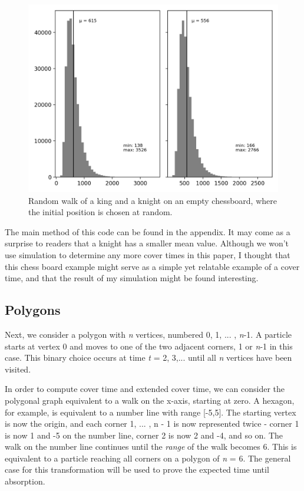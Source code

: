 \documentclass[11pt]{article}
\begin{document}
\begin{figure}[H]
\centering
\includegraphics[scale = 0.5]{chessdistrs}
\caption{Random walk of a king and a knight on an empty chessboard, where the initial position is chosen at random.}
\end{figure}

The main method of this code can be found in the appendix. It may come as a surprise to readers that a knight has a smaller mean value. Although we won't use simulation to determine any more cover times in this paper, I thought that this chess board example might serve as a simple yet relatable example of a cover time, and that the result of my simulation might be found interesting. 
 \cite{BG}






\subsection{Polygons}

\indent \indent Next, we consider a polygon with \textit{n} vertices, numbered 0, 1, ... , \textit{n}-1. A particle starts at vertex 0 and moves to one of the two adjacent corners, 1 or \textit{n}-1 in this case. This binary choice occurs at time \textit{t} = 2, 3,... until all \textit{n} vertices have been visited. 

In order to compute cover time and extended cover time, we can consider the polygonal graph equivalent to a walk on the x-axis, starting at zero. A hexagon, for example, is equivalent to a number line with range [-5,5]. The starting vertex is now the origin, and each corner 1, ... , n - 1 is now represented twice - corner 1 is now 1 and -5 on the number line, corner 2 is now 2 and -4, and so on. The walk on the number line continues until the \textit{range} of the walk becomes 6. This is equivalent to a particle reaching all corners on a polygon of \textit{n} = 6. The general case for this transformation will be used to prove the expected time until absorption. 
\end{document}
